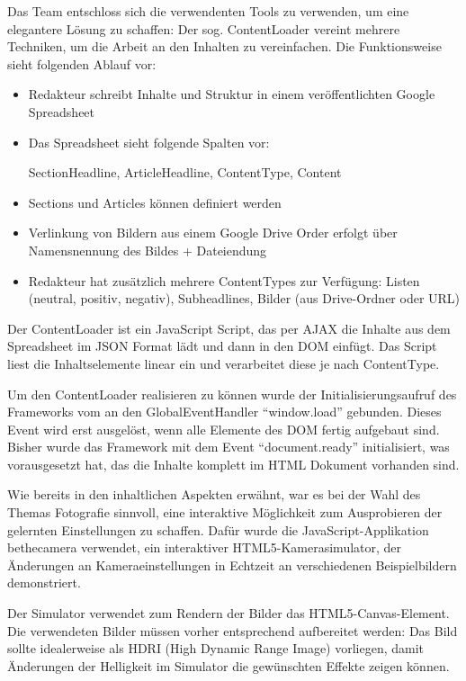 \documentclass{article}
\begin{document}
Das Team entschloss sich die verwendenten Tools zu verwenden, um eine elegantere L\"osung zu schaffen: Der sog. ContentLoader vereint mehrere Techniken, um die Arbeit an den Inhalten zu vereinfachen. Die Funktionsweise sieht folgenden Ablauf vor:
\begin{itemize}
\item Redakteur schreibt Inhalte und Struktur in einem ver\"offentlichten Google Spreadsheet 
\item Das Spreadsheet sieht folgende Spalten vor:

SectionHeadline, ArticleHeadline, ContentType, Content

\item Sections und Articles k\"onnen definiert werden
\item Verlinkung von Bildern aus einem Google Drive Order erfolgt \"uber Namensnennung des Bildes + Dateiendung
\item Redakteur hat zus\"atzlich mehrere ContentTypes zur Verf\"ugung: Listen (neutral, positiv, negativ), Subheadlines, Bilder (aus Drive-Ordner oder URL)

\end{itemize}

Der ContentLoader ist ein JavaScript Script, das per AJAX die Inhalte aus dem Spreadsheet im JSON Format l\"adt und dann in den DOM einf\"ugt. Das Script liest die Inhaltselemente linear ein und verarbeitet diese je nach ContentType.

Um den ContentLoader realisieren zu k\"onnen wurde der Initialisierungsaufruf des Frameworks vom an den GlobalEventHandler “window.load” gebunden. Dieses Event wird erst ausgel\"ost, wenn alle Elemente des DOM fertig aufgebaut sind. Bisher wurde das Framework mit dem Event “document.ready” initialisiert, was vorausgesetzt hat, das die Inhalte komplett im HTML Dokument vorhanden sind.


Wie bereits in den inhaltlichen Aspekten erw\"ahnt, war es bei der Wahl des Themas Fotografie sinnvoll, eine interaktive M\"oglichkeit zum Ausprobieren der gelernten Einstellungen zu schaffen. Daf\"ur wurde die JavaScript-Applikation bethecamera verwendet, ein interaktiver HTML5-Kamerasimulator, der \"Anderungen an Kameraeinstellungen in Echtzeit an verschiedenen Beispielbildern demonstriert.

Der Simulator verwendet zum Rendern der Bilder das HTML5-Canvas-Element. 
Die verwendeten Bilder m\"ussen vorher entsprechend aufbereitet werden: Das Bild sollte idealerweise als HDRI (High Dynamic Range Image) vorliegen, damit \"Anderungen der Helligkeit im Simulator die gew\"unschten Effekte zeigen k\"onnen. 
\end{document}
